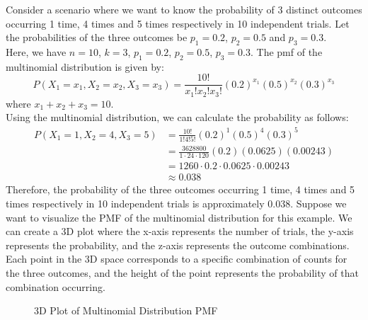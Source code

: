 \documentclass[openany]{book}
\begin{document}
\begin{example}
    Consider a scenario where we want to know the probability of 3 distinct outcomes occurring 1 time, 4 times and 5 times respectively in 10 independent trials. Let the probabilities of the three outcomes be $p_1 = 0.2$, $p_2 = 0.5$ and $p_3 = 0.3$. \\
    Here, we have $n = 10$, $k = 3$, $p_1 = 0.2$, $p_2 = 0.5$, $p_3 = 0.3$. The pmf of the multinomial distribution is given by:
    $$P(X_1 = x_1, X_2 = x_2, X_3 = x_3) = \frac{10!}{x_1! x_2! x_3!} (0.2)^{x_1} (0.5)^{x_2} (0.3)^{x_3}$$
    where $x_1 + x_2 + x_3 = 10$. \\
    Using the multinomial distribution, we can calculate the probability as follows:
    \begin{align*}
        P(X_1 = 1, X_2 = 4, X_3 = 5) &= \frac{10!}{1! 4! 5!} (0.2)^1 (0.5)^4 (0.3)^5 \\
        &= \frac{3628800}{1 \cdot 24 \cdot 120} (0.2) (0.0625) (0.00243) \\
        &= 1260 \cdot 0.2 \cdot 0.0625 \cdot 0.00243 \\
        &\approx 0.038
    \end{align*}
    Therefore, the probability of the three outcomes occurring 1 time, 4 times and 5 times respectively in 10 independent trials is approximately 0.038.
    Suppose we want to visualize the PMF of the multinomial distribution for this example. We can create a 3D plot where the x-axis represents the number of trials, the y-axis represents the probability, and the z-axis represents the outcome combinations. Each point in the 3D space corresponds to a specific combination of counts for the three outcomes, and the height of the point represents the probability of that combination occurring.
    \begin{figure}[H]
        \centering 
        \caption{3D Plot of Multinomial Distribution PMF}
    \end{figure}
\end{example}
\end{document}
